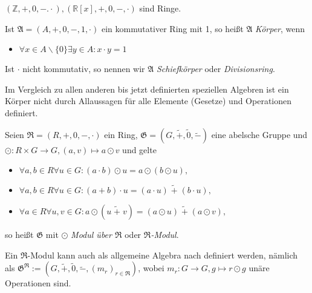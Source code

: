 \begin{example}
    $(\mathbb{Z}, +, 0, -. \cdot), (\mathbb{R}[x], +, 0, -, \cdot)$ sind Ringe.
\end{example}

\begin{samepage}
\begin{definition}
    Ist $\mathfrak{A} = (A,+,0,-,1,\cdot)$ ein kommutativer Ring mit 1, so heißt $\mathfrak{A}$ \emph{Körper}, wenn
    \begin{itemize}[topsep=0pt, label={--}]
        \item $\forall x \in A\backslash \{0\} \exists y \in A: x\cdot y = 1$
    \end{itemize}
    Ist $\cdot$ nicht kommutativ, so nennen wir $\mathfrak{A}$ \emph{Schiefkörper} oder \emph{Divisionsring}.
\end{definition}
\end{samepage}

\begin{remark}
    Im Vergleich zu allen anderen bis jetzt definierten speziellen Algebren ist ein Körper nicht durch Allaussagen für alle Elemente (Gesetze) und Operationen definiert. 
\end{remark}

\begin{definition}
    Seien $\mathfrak{R} = (R, +, 0, -, \cdot)$ ein Ring, $\mathfrak{G} = (G, \widetilde{+}, \widetilde{0}, \widetilde{-})$ eine abelsche Gruppe und $\odot: R \times G \to G, (a, v) \mapsto a \odot v$ und gelte
    \begin{itemize}[topsep=0pt, label={--}]
        \item $\forall a,b \in R \forall u \in G: (a \cdot b)\odot u = a \odot (b \odot u),$
        \item $\forall a,b \in R \forall u \in G: (a + b) \cdot u = (a \cdot u) \;\widetilde{+}\; (b \cdot u),$
        \item $\forall a \in R \forall u,v \in G: a \odot (u \;\widetilde{+}\; v) = (a \odot u) \;\widetilde{+}\; (a \odot v),$
    \end{itemize}
    so heißt $\mathfrak{G}$ mit $\odot$ \emph{Modul über $\mathfrak{R}$} oder \emph{$\mathfrak{R}$-Modul}.

    Ein $\mathfrak{R}$-Modul kann auch als allgemeine Algebra nach  definiert werden, nämlich als $\mathfrak{G}^\mathfrak{R} := (G, \widetilde{+}, \widetilde{0}, \widetilde{-}, (m_r)_{r \in \mathfrak{R}})$, wobei $m_r: G \to G, g \mapsto r \odot g$ unäre Operationen sind.
\end{definition}

